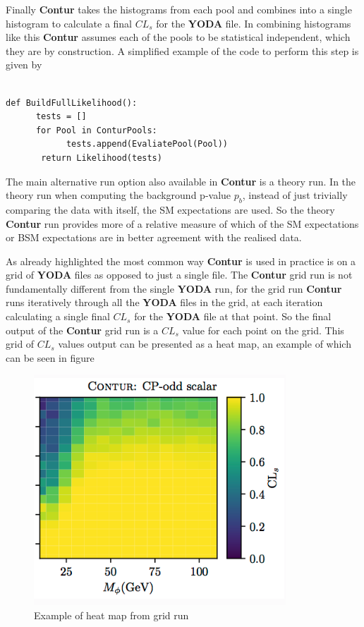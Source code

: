 Finally \textbf{Contur} takes the histograms from each pool and combines into a single histogram to calculate a final $CL_s$ for the \textbf{YODA} file. In combining histograms like this \textbf{Contur} assumes each of the pools to be statistical independent, which they are by construction. A simplified example of the code to perform this step is given by

\begin{code}
\label{code:full_likelihood}
\begin{verbatim}

def BuildFullLikelihood():
      tests = []
      for Pool in ConturPools:
            tests.append(EvaliatePool(Pool))
       return Likelihood(tests)
\end{verbatim}
\end{code}

The main alternative run option also available in \textbf{Contur} is a theory run. In the theory run when computing the background p-value $p_b$, instead of just trivially comparing the data with itself, the SM expectations are used. So the theory \textbf{Contur} run provides more of a relative measure of which of the SM expectations or BSM expectations are in better agreement with the realised data.

As already highlighted the most common way \textbf{Contur} is used in practice is on a grid of \textbf{YODA} files as opposed to just a single file. The \textbf{Contur} grid run is not fundamentally different from the single \textbf{YODA} run, for the grid run \textbf{Contur} runs iteratively through all the \textbf{YODA} files in the grid, at each iteration calculating a single final $CL_{s}$ for the \textbf{YODA} file at that point. So the final output of the \textbf{Contur} grid run is a $CL_{s}$ value for each point on the grid. This grid of $CL_{s}$ values output can be presented as a heat map, an example of which can be seen in figure 


\begin{figure}[H]
\centering
\includegraphics[scale=1]{plots/example_heatmap.png}
\caption{Example of heat map from grid run}
\label{fig:example_heatmap}
\end{figure}
